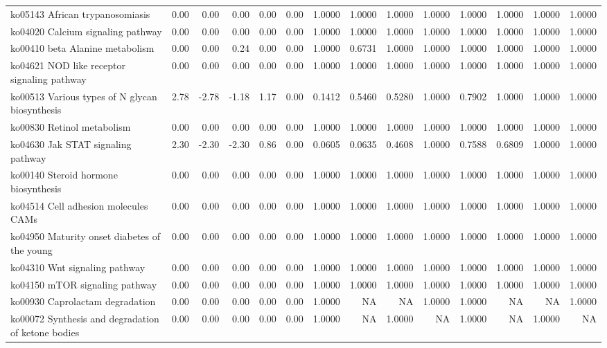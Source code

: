 {\begin{landscape}
\begin{longtable}{ | l | r | r | r | r | r | r  | r | r | r | r | r | r  | r  |}
			ko05143  African trypanosomiasis & 0.00 & 0.00 & 0.00 & 0.00 & 0.00 & 1.0000 & 1.0000 & 1.0000 & 1.0000 & 1.0000 & 1.0000 & 1.0000 & 1.0000 \\ 
			ko04020  Calcium signaling pathway & 0.00 & 0.00 & 0.00 & 0.00 & 0.00 & 1.0000 & 1.0000 & 1.0000 & 1.0000 & 1.0000 & 1.0000 & 1.0000 & 1.0000 \\ 
			ko00410  beta Alanine metabolism & 0.00 & 0.00 & 0.24 & 0.00 & 0.00 & 1.0000 & 0.6731 & 1.0000 & 1.0000 & 1.0000 & 1.0000 & 1.0000 & 1.0000 \\ 
			ko04621  NOD like receptor signaling pathway & 0.00 & 0.00 & 0.00 & 0.00 & 0.00 & 1.0000 & 1.0000 & 1.0000 & 1.0000 & 1.0000 & 1.0000 & 1.0000 & 1.0000 \\ 
			ko00513  Various types of N glycan biosynthesis & 2.78 & -2.78 & -1.18 & 1.17 & 0.00 & 0.1412 & 0.5460 & 0.5280 & 1.0000 & 0.7902 & 1.0000 & 1.0000 & 1.0000 \\ 
			ko00830  Retinol metabolism & 0.00 & 0.00 & 0.00 & 0.00 & 0.00 & 1.0000 & 1.0000 & 1.0000 & 1.0000 & 1.0000 & 1.0000 & 1.0000 & 1.0000 \\ 
			ko04630  Jak STAT signaling pathway & 2.30 & -2.30 & -2.30 & 0.86 & 0.00 & 0.0605 & 0.0635 & 0.4608 & 1.0000 & 0.7588 & 0.6809 & 1.0000 & 1.0000 \\ 
			ko00140  Steroid hormone biosynthesis & 0.00 & 0.00 & 0.00 & 0.00 & 0.00 & 1.0000 & 1.0000 & 1.0000 & 1.0000 & 1.0000 & 1.0000 & 1.0000 & 1.0000 \\ 
			ko04514  Cell adhesion molecules CAMs  & 0.00 & 0.00 & 0.00 & 0.00 & 0.00 & 1.0000 & 1.0000 & 1.0000 & 1.0000 & 1.0000 & 1.0000 & 1.0000 & 1.0000 \\ 
			ko04950  Maturity onset diabetes of the young & 0.00 & 0.00 & 0.00 & 0.00 & 0.00 & 1.0000 & 1.0000 & 1.0000 & 1.0000 & 1.0000 & 1.0000 & 1.0000 & 1.0000 \\ 
			ko04310  Wnt signaling pathway & 0.00 & 0.00 & 0.00 & 0.00 & 0.00 & 1.0000 & 1.0000 & 1.0000 & 1.0000 & 1.0000 & 1.0000 & 1.0000 & 1.0000 \\ 
			ko04150  mTOR signaling pathway & 0.00 & 0.00 & 0.00 & 0.00 & 0.00 & 1.0000 & 1.0000 & 1.0000 & 1.0000 & 1.0000 & 1.0000 & 1.0000 & 1.0000 \\ 
			ko00930  Caprolactam degradation & 0.00 & 0.00 & 0.00 & 0.00 & 0.00 & 1.0000 & NA & NA & 1.0000 & 1.0000 & NA & NA & 1.0000 \\ 
			ko00072  Synthesis and degradation of ketone bodies & 0.00 & 0.00 & 0.00 & 0.00 & 0.00 & 1.0000 & NA & 1.0000 & NA & 1.0000 & NA & 1.0000 & NA \\ 

\end{longtable}
\end{landscape}}
